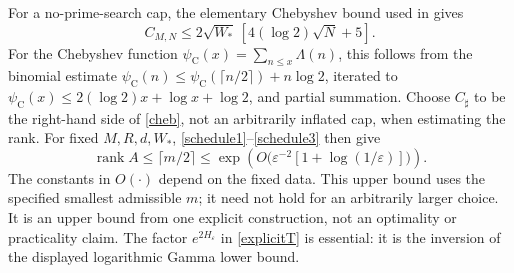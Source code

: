 \documentclass[11pt]{article}
\begin{document}
For a no-prime-search cap, the elementary Chebyshev bound used in \cite{collarnote} gives
\begin{equation}\label{cheb}
 C_{M,N}\le2\sqrt{W_*}\,[4(\log2)\sqrt N+5].
\end{equation}
For the Chebyshev function $\psi_{\mathrm C}(x)=\sum_{n\le x}\Lambda(n)$, this follows from the binomial estimate $\psi_{\mathrm C}(n)\le\psi_{\mathrm C}(\lceil n/2\rceil)+n\log2$, iterated to $\psi_{\mathrm C}(x)\le2(\log2)x+\log x+\log2$, and partial summation. Choose $C_\sharp$ to be the right-hand side of \eqref{cheb}, not an arbitrarily inflated cap, when estimating the rank. For fixed $M,R,d,W_*$, \eqref{schedule1}--\eqref{schedule3} then give
\begin{equation}\label{rankcost}
 \operatorname{rank}A\le\lceil m/2\rceil\le\exp\!\left(O\bigl(\varepsilon^{-2}[1+\log(1/\varepsilon)]\bigr)\right).
\end{equation}
The constants in $O(\cdot)$ depend on the fixed data. This upper bound uses the specified smallest admissible $m$; it need not hold for an arbitrarily larger choice. It is an upper bound from one explicit construction, not an optimality or practicality claim. The factor $e^{2H_\varepsilon}$ in \eqref{explicitT} is essential: it is the inversion of the displayed logarithmic Gamma lower bound.
\end{document}
